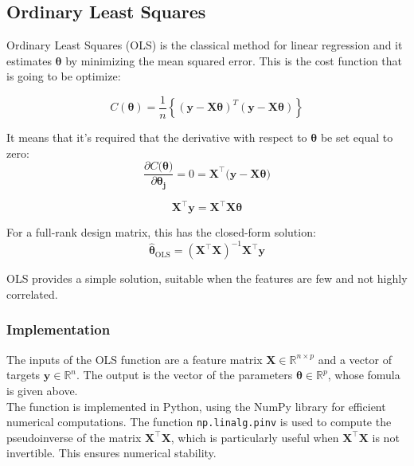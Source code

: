 \documentclass[
 reprint,            %
 amsmath,amssymb,
 aps,
]{revtex4-2}
\begin{document}
\subsection{Ordinary Least Squares}
Ordinary Least Squares (OLS) is the classical method for linear regression and it estimates $\boldsymbol{\theta}$ by minimizing the mean squared error\cite{hjorthjensen2025week35}. This is the cost function that is going to be optimize:

$$
C(\boldsymbol{\theta})=\frac{1}{n}\left\{\left(\boldsymbol{y}-\boldsymbol{X}\boldsymbol{\theta}\right)^T\left(\boldsymbol{y}-\boldsymbol{X}\boldsymbol{\theta}\right)\right\}$$

It means that it's required that the derivative with respect to $\boldsymbol{\theta}$ be set equal to zero: $$\frac{\partial C(\boldsymbol{\theta)}}{\partial \boldsymbol{\theta_j}} =0= \mathbf{X}^\top(\mathbf{y-X\boldsymbol{\theta})}$$

$$\mathbf{X}^\top \mathbf{y}= \mathbf{X}^\top \mathbf{X} \boldsymbol{\theta}$$

For a full-rank design matrix, this has the closed-form solution:
$$
\hat{\boldsymbol{\theta}}_{\text{OLS}} = (\mathbf{X}^\top \mathbf{X})^{-1} \mathbf{X}^\top \mathbf{y}
$$

OLS provides a simple solution, suitable when the features are few and not highly correlated.

\subsubsection{Implementation}
The inputs of the OLS function are a feature matrix $\mathbf{X} \in \mathbb{R}^{n \times p}$ and a vector of targets $\mathbf{y} \in \mathbb{R}^n$. The output is the vector of the parameters $\boldsymbol{\theta} \in \mathbb{R}^{p}$, whose fomula is given above.\\
The function is implemented in Python, using the NumPy library for efficient numerical computations. The function \texttt{np.linalg.pinv} is used to compute the pseudoinverse of the matrix $\mathbf{X}^\top \mathbf{X}$, which is particularly useful when $\mathbf{X}^\top \mathbf{X}$ is not invertible. This ensures numerical stability.
\end{document}
